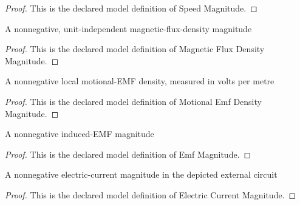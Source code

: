 \begin{proof}
  This is the declared model definition of Speed Magnitude.
\end{proof}
\begin{definition}
  \label{def:physics:phyx-mini-0920:phyxminiproblems-problemphyxmini0920-magneticfluxdensitymagnitude}
  A nonnegative, unit-independent magnetic-flux-density magnitude
\end{definition}
\begin{proof}
  This is the declared model definition of Magnetic Flux Density Magnitude.
\end{proof}
\begin{definition}
  \label{def:physics:phyx-mini-0920:phyxminiproblems-problemphyxmini0920-motionalemfdensitymagnitude}
  A nonnegative local motional-EMF density, measured in volts per metre
\end{definition}
\begin{proof}
  This is the declared model definition of Motional Emf Density Magnitude.
\end{proof}
\begin{definition}
  \label{def:physics:phyx-mini-0920:phyxminiproblems-problemphyxmini0920-emfmagnitude}
  A nonnegative induced-EMF magnitude
\end{definition}
\begin{proof}
  This is the declared model definition of Emf Magnitude.
\end{proof}
\begin{definition}
  \label{def:physics:phyx-mini-0920:phyxminiproblems-problemphyxmini0920-electriccurrentmagnitude}
  A nonnegative electric-current magnitude in the depicted external circuit
\end{definition}
\begin{proof}
  This is the declared model definition of Electric Current Magnitude.
\end{proof}

